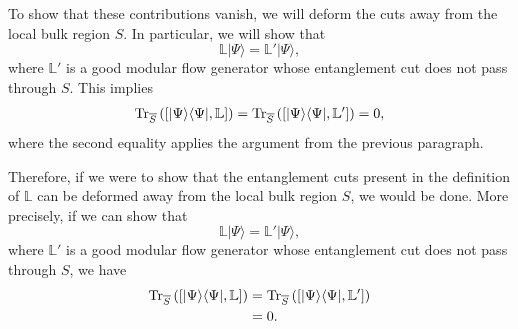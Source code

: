 \documentclass[12pt, nofootinbib]{article}
\theoremstyle{plain}
\theoremstyle{assumption}
\theoremstyle{definition}
\theoremstyle{plain}
\theoremstyle{plain}
\theoremstyle{plain}
\theoremstyle{plain}
\theoremstyle{plain}
\begin{document}
To show that these contributions vanish, we will deform the cuts away from the local bulk region $S$. In particular, we will show that 
\begin{equation}
    \mathbb{L}|\Psi\rangle = \mathbb{L}'|\Psi\rangle, \label{eq:deformation_generator}
\end{equation}
where $\mathbb{L}'$ is a good modular flow generator whose entanglement cut does not pass through $S$.
This implies
\begin{equation}
\begin{aligned}
    {{\rm Tr}}_{\overline{S}}\left( [{|\Psi\rangle}{\langle\Psi|}, \mathbb{L}]\right) = {{\rm Tr}}_{\overline{S}}\left( [{|\Psi\rangle}{\langle\Psi|}, \mathbb{L}']\right) 
    =0,
\end{aligned}
\label{eq:first_order_contribution_zero}
\end{equation}
where the second equality applies the argument from the previous paragraph.

Therefore, if we were to show that the entanglement cuts present in the definition of $\mathbb{L}$ can be deformed away from the local bulk region $S$, we would be done. More precisely, if we can show that 
\begin{equation}
    \mathbb{L}|\Psi\rangle = \mathbb{L}'|\Psi\rangle, \label{eq:deformation_generator}
\end{equation}
where $\mathbb{L}'$ is a good modular flow generator whose entanglement cut does not pass through $S$, we have
\begin{equation}
\begin{aligned}
    {{\rm Tr}}_{\overline{S}}\left( [{|\Psi\rangle}{\langle\Psi|}, \mathbb{L}]\right) &= {{\rm Tr}}_{\overline{S}}\left( [{|\Psi\rangle}{\langle\Psi|}, \mathbb{L}']\right) \\
    &=0.
\end{aligned}
\label{eq:first_order_contribution_zero}
\end{equation}
\end{document}
